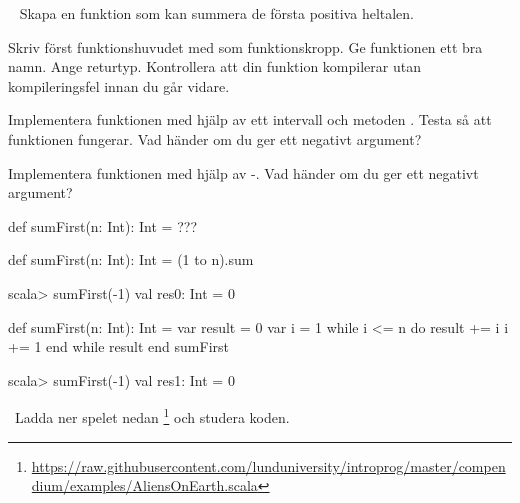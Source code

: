 \Task \label{task:funcsumfirst} \what~
Skapa en funktion som kan summera de första  positiva heltalen.

\Subtask Skriv först funktionshuvudet med  som funktionskropp. Ge funktionen ett bra namn. Ange returtyp. Kontrollera att din funktion kompilerar utan kompileringsfel innan du går vidare.

\Subtask Implementera funktionen med hjälp av ett intervall och metoden . Testa så att funktionen fungerar. Vad händer om du ger ett negativt argument?

\Subtask Implementera funktionen med hjälp av -. Vad händer om du ger ett negativt argument?

\SOLUTION

\TaskSolved \what

\SubtaskSolved
\begin{Code}
def sumFirst(n: Int): Int = ???
\end{Code}

\SubtaskSolved
\begin{Code}
def sumFirst(n: Int): Int = (1 to n).sum
\end{Code}
\begin{REPL}
scala> sumFirst(-1)
val res0: Int = 0
\end{REPL}

\SubtaskSolved
\begin{Code}
def sumFirst(n: Int): Int = 
  var result = 0
  var i = 1
  while i <= n do 
    result += i
    i += 1
  end while
  result
end sumFirst
\end{Code}
\begin{REPL}
scala> sumFirst(-1)
val res1: Int = 0
\end{REPL}

\QUESTEND





\QUESTBEGIN

\Task  \what~Ladda ner spelet nedan \footnote{
\url{https://raw.githubusercontent.com/lunduniversity/introprog/master/compendium/examples/AliensOnEarth.scala}} och studera koden.


%

